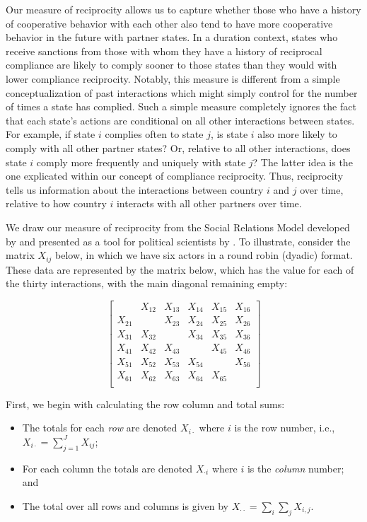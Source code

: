  Our measure of reciprocity allows us to capture whether those who have a history of cooperative behavior with each other also tend to have more cooperative behavior in the future with partner states. In a duration context, states who receive sanctions from those with whom they have a history of reciprocal compliance are likely to comply sooner to those states than they would with lower compliance reciprocity. Notably, this measure is different from a simple conceptualization of past interactions which might simply control for the number of times a state has complied. Such a simple measure completely ignores the fact that each state's actions are conditional on all other interactions between states. For example, if state $i$ complies often to state $j$, is state $i$ also more likely to comply with all other partner states? Or, relative to all other interactions, does state $i$ comply more frequently and uniquely with state $j$? The latter idea is the one explicated within our  concept of compliance reciprocity. Thus, reciprocity tells us information about the interactions between country $i$ and $j$ over time, relative to how country $i$ interacts with all other partners over time. 

We draw our measure of reciprocity from the Social Relations Model developed by \citet{kenny1994interpersonal} and presented as a tool for political scientists by \cite{AnneAuthor}. To illustrate, consider the matrix $X_{ij}$ below, in which we have six actors in a round robin (dyadic) format. These data are represented by the matrix below, which has the value for each of the thirty interactions, with the main diagonal remaining empty:

\singlespacing
\[
\left[
\begin{array}{cccccc}
 & X_{12}  & X_{13}  & X_{14} & X_{15} & X_{16} \\
X_{21}  &  & X_{23}  & X_{24} & X_{25} & X_{26} \\
X_{31}  & X_{32}  &    & X_{34} & X_{35} & X_{36} \\
X_{41}  & X_{42}  & X_{43}  &  & X_{45} & X_{46} \\
X_{51}  & X_{52}  & X_{53}  & X_{54} &   & X_{56} \\
X_{61}  & X_{62}  & X_{63}  & X_{64} & X_{65} &   \\
\end{array}
\right]
\]

\doublespacing
First, we begin with calculating the row column and total sums:
\begin{itemize}
\item The totals for each \emph{ row} are denoted $X_{i \cdot}$ where $i$ is the row number, i.e.,
~\\
$X_{i \cdot} = \sum_{j=1}^{J} X_{ij}$;
\item For each column the totals are denoted
 $X_{\cdot i}$ where $i$ is the \emph{column} number; and 
 \item The total over all rows and columns is given by $X_{\cdot \cdot} = \sum_i \sum_j X_{i,j}$.
 \end{itemize}
 
